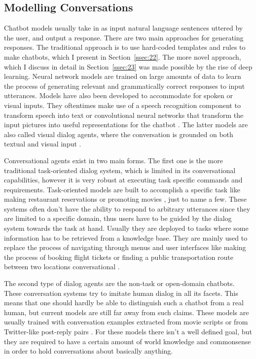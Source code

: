 \documentclass[12pt]{article}
\begin{document}
\subsection{Modelling Conversations} \label{ssec:21}
Chatbot models usually take in as input natural language sentences uttered by the user, and output a response. There are two main approaches for generating responses. The traditional approach is to use hard-coded templates and rules to make chatbots, which I present in Section~\ref{ssec:22}. The more novel approach, which I discuss in detail in Section~\ref{ssec:23} was made possible by the rise of deep learning. Neural network models are trained on large amounts of data to learn the process of generating relevant and grammatically correct responses to input utterances. Models have also been developed to accommodate for spoken or visual inputs. They oftentimes make use of a speech recognition component to transform speech into text \cite{Serban:2017} or convolutional neural networks that transform the input pictures into useful representations for the chatbot \cite{Havrylov:2017}. The latter models are also called visual dialog agents, where the conversation is grounded on both textual and visual input \cite{Das:2017}.

Conversational agents exist in two main forms. The first one is the more traditional task-oriented dialog system, which is limited in its conversational capabilities, however it is very robust at executing task specific commands and requirements. Task-oriented models are built to accomplish a specific task like making restaurant reservations \cite{Joshi:2017,Bordes:2016} or promoting movies \cite{Yu:2017}, just to name a few. These systems often don't have the ability to respond to arbitrary utterances since they are limited to a specific domain, thus users have to be guided by the dialog system towards the task at hand. Usually they are deployed to tasks where some information has to be retrieved from a knowledge base. They are mainly used to replace the process of navigating through menus and user interfaces like making the process of booking flight tickets or finding a public transportation route between two locations conversational \cite{Zhao:2017}.  

The second type of dialog agents are the non-task or open-domain chatbots. These conversation systems try to imitate human dialog in all its facets. This means that one should hardly be able to distinguish such a chatbot from a real human, but current models are still far away from such claims. These models are usually trained with conversation examples extracted from movie scripts or from Twitter-like post-reply pairs \cite{Vinyals:2015,Shang:2015,Serban:2015,Li:2016}. For these models there isn't a well defined goal, but they are required to have a certain amount of world knowledge and commonsense in order to hold conversations about basically anything.
\end{document}
